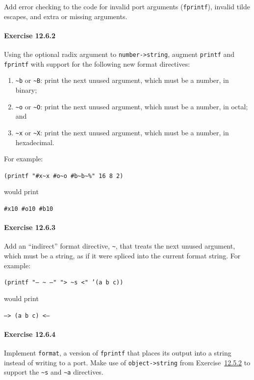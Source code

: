 \label{examples_s40}Add error checking to the code for invalid port arguments (\texttt{fprintf}),
invalid tilde escapes, and extra or missing arguments.


\paragraph{Exercise \label{examples_g182}12.6.2}


\label{examples_s41}Using the optional radix argument to \texttt{number-\textgreater{}string},
augment \texttt{printf} and \texttt{fprintf} with support for the following
new format directives:


 
 \begin{enumerate}[\it a. ]
\item \texttt{\~{}b} or \texttt{\~{}B}: print the next unused argument,
which must be a number, in binary;
\item \texttt{\~{}o} or \texttt{\~{}O}: print the next unused argument,
which must be a number, in octal; and
\item \texttt{\~{}x} or \texttt{\~{}X}: print the next unused argument,
which must be a number, in hexadecimal.
\end{enumerate}


For example:


\texttt{(printf "\#{}x\~{}x \#{}o\~{}o \#{}b\~{}b\~{}\%{}" 16 8 2)}

would print


\texttt{\#{}x10 \#{}o10 \#{}b10}
\paragraph{Exercise \label{examples_g183}12.6.3}


\label{examples_s42}Add an ``indirect'' format directive, \texttt{\~{}\@{}}, that treats the next
unused argument, which must be a string, as if it were spliced into
the current format string.
For example:


\texttt{(printf "--- \~{}\@{} ---" "\textgreater{} \~{}s \textless{}" '(a b c))}

would print


\texttt{---\textgreater{} (a b c) \textless{}---}
\paragraph{Exercise \label{examples_g184}12.6.4}


\label{examples_s43}Implement \texttt{format}, a version of \texttt{fprintf} that places its output
into a string instead of writing to a port.
Make use of \texttt{object-\textgreater{}string} from Exercise \hyperref[examples_g178]{12.5.2}
to support the \texttt{\~{}s} and \texttt{\~{}a} directives.


